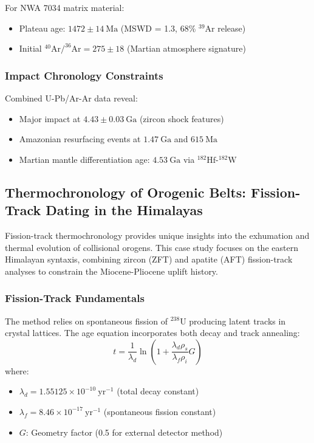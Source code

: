 \documentclass{article}
\begin{document}
For NWA 7034 matrix material:
\begin{itemize}
    \item Plateau age: \(1472 \pm 14\ \text{Ma}\) (MSWD = 1.3, 68\% \(^{39}\text{Ar}\) release)  
    \item Initial \(^{40}\text{Ar}/^{36}\text{Ar} = 275 \pm 18\) (Martian atmosphere signature)
\end{itemize}

\subsubsection*{Impact Chronology Constraints}
Combined U-Pb/Ar-Ar data reveal:
\begin{itemize}
    \item Major impact at \(4.43 \pm 0.03\ \text{Ga}\) (zircon shock features)  
    \item Amazonian resurfacing events at \(1.47\ \text{Ga}\) and \(615\ \text{Ma}\)  
    \item Martian mantle differentiation age: \(4.53\ \text{Ga}\) via \(^{182}\text{Hf}\)-\(^{182}\text{W}\) \cite{Kleine2009}
\end{itemize}

\subsection{Thermochronology of Orogenic Belts: Fission-Track Dating in the Himalayas}
\label{subsec:fission_track_case}

Fission-track thermochronology provides unique insights into the exhumation and thermal evolution of collisional orogens. This case study focuses on the eastern Himalayan syntaxis, combining zircon (ZFT) and apatite (AFT) fission-track analyses to constrain the Miocene-Pliocene uplift history.

\subsubsection*{Fission-Track Fundamentals}
The method relies on spontaneous fission of \(^{238}\text{U}\) producing latent tracks in crystal lattices. The age equation incorporates both decay and track annealing:
\begin{equation}
    t = \frac{1}{\lambda_d} \ln\left(1 + \frac{\lambda_d \rho_s}{\lambda_f \rho_i} G \right)
    \label{eq:ft_age}
\end{equation}
where:
\begin{itemize}
    \item \(\lambda_d = 1.55125 \times 10^{-10}\ \text{yr}^{-1}\) (total decay constant)
    \item \(\lambda_f = 8.46 \times 10^{-17}\ \text{yr}^{-1}\) (spontaneous fission constant)
    \item \(G\): Geometry factor (0.5 for external detector method)
\end{itemize}
\end{document}
